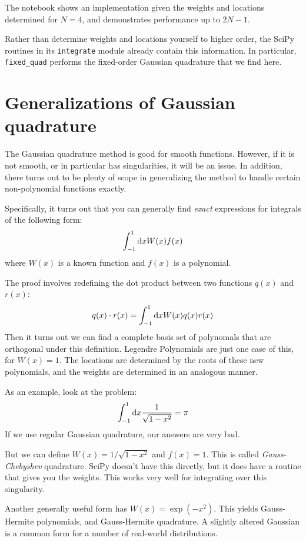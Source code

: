 The notebook shows an implementation given the weights and locations
determined for $N=4$, and demonstrates performance up to $2N-1$.

Rather than determine weights and locations yourself to higher order,
the SciPy routines in its {\tt integrate} module already contain this
information. In particular, {\tt fixed\_quad} performs the fixed-order
Gaussian quadrature that we find here.

\section{Generalizations of Gaussian quadrature}

The Gaussian quadrature method is good for smooth functions. However,
if it is not smooth, or in particular has singularities, it will be an
issue. In addition, there turns out to be plenty of scope in
generalizing the method to handle certain non-polynomial functions
exactly.

Specifically, it turns out that you can generally find {\it exact}
expressions for integrals of the following form:
\begin{equation}
\int_{-1}^{1} {\rm d}x W(x) f(x) 
\end{equation}
where $W(x)$ is a known function and $f(x)$ is a polynomial. 

The proof involves redefining the dot product between two functions
$q(x)$ and $r(x)$:
\begin{equation}
  q(x) \cdot r(x) = \int_{-1}^{1} {\rm d}x W(x) q(x) r(x)
\end{equation}
Then it turns out we can find a complete basis set of polynomals that
are orthogonal under this definition. Legendre Polynomials are just
one case of this, for $W(x)=1$. The locations are determined by the
roots of these new polynomials, and the weights are determined in an
analogous manner.

As an example, look at the problem:
\begin{equation}
\int_{-1}^{1} {\rm d}x \frac{1}{\sqrt{1-x^2}} = \pi
\end{equation}
If we use regular Gaussian quadrature, our answers are very bad.

But we can define $W(x)=1/\sqrt{1-x^2}$ and $f(x)=1$. This is called
{\it Gauss-Chebyshev} quadrature. SciPy doesn't have this directly,
but it does have a routine that gives you the weights.  This works
very well for integrating over this singularity.

Another generally useful form has $W(x) = \exp(-x^2)$. This yields
Gauss-Hermite polynomials, and Gauss-Hermite quadrature. A slightly
altered Gaussian is a common form for a number of real-world
distributions. 

